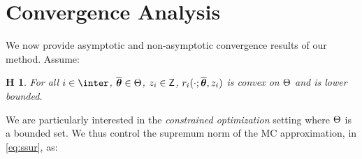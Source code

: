 \documentclass[final,12pt]{alt2022} %
\newtheorem{assumption}{H\!\!}
\begin{document}
\vspace{-0.05in}
\section{Convergence Analysis}\label{sec:analysis}
\vspace{-0.05in}

We now provide asymptotic and non-asymptotic convergence results of our method. Assume:
\begin{assumption} \label{ass:lips}
For all $i \in \inter$, $\op \in \Param$, $z_i \in \Zset$, $\rsur{i}{\cdot}{\op}{z_i}$ is convex on $\Param$ and is lower bounded.
\end{assumption}
We are particularly interested in the \emph{constrained optimization} setting where $\Param$ is a bounded set.
We thus control the supremum norm of the MC approximation, in \eqref{eq:ssur}, as:
\end{document}
